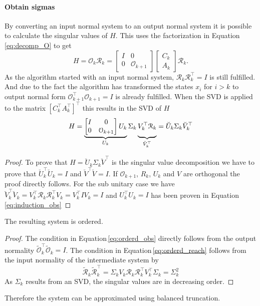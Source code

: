 \documentclass[doctype=mastersthesis,BCOR=15mm,biblatex]{ldvbook}%
\newcommand{\R}{\mathcal{R}} %
\newcommand{\Ob}{\mathcal{O}} %
\newcommand{\eye}{I} %
\begin{document}
\paragraph{Obtain sigmas}
By converting an input normal system to an output normal system it is possible to calculate the singular values of $H$.
This uses the factorization in Equation\,\ref{eq:decomp_O}
to get
 \begin{equation}
 H = \Ob_k \R_k = 
 \begin{bmatrix}
 \eye& 0 \\
 0& \Ob_{k+1}
 \end{bmatrix}
 \begin{bmatrix}
 C_k\\
 A_k
 \end{bmatrix}
 \R_k
 .
 \end{equation}
As the algorithm started with an input normal system, $\R_k\R_k^\top = \eye$ is still fulfilled.
And due to the fact the algorithm has transformed the states $x_i$ for $i>k$ to output normal form $\Ob_{k+1}^\top \Ob_{k+1} = \eye$ is already fulfilled.
When the SVD is applied to the matrix $[C_k^\top A_k^\top]^\top$ this results in the SVD of $H$
 \begin{equation}
 H = 
 \underbrace{
 	\begin{bmatrix}
 	\eye& 0 \\
 	0& \Ob_{k+1}
 	\end{bmatrix}
 	U_k}_{U_k} 
 \Sigma_k 
 \underbrace{\vphantom{\begin{matrix} 0 \\0\end{matrix}}
 	V_k^\top
 	\R_k}_{\breve{V}_k^\top}
 =\breve{U}_k\Sigma_k \breve{V}_k^\top
 \end{equation}

 \begin{proof}
 	To prove that $H = \breve{U}_k\Sigma_k\breve{V}^\top$ is the singular value decomposition we have to prove that $\breve{U}_k^\top \breve{U}_k= \eye$ and $\breve{V}^\top \breve{V} = \eye$.
 	If $\Ob_{k+1}$, $R_k$, $U_k$ and $V$ are orthogonal the proof directly follows. For the sub unitary case we have 
 	$
 	\breve{V}_k^\top \breve{V}_k
 	=
 	V_k^\top
 	\R_k
 	\R_k^\top
 	V_k
 	=
 	V_k^\top
 	\eye
 	V_k
 	=
 	\eye
 	$
 	and
 	$
 	U_k^\top U_k
 	=
 	\eye 
 	$
 	has been proven in Equation\,\ref{eq:induction_obs}
 \end{proof}

The resulting system is ordered.
\begin{proof}
	The condition in Equation\,\ref{eq:orderd_obs} directly follows from the output normality $\tilde{\Ob}_k^\top \tilde{\Ob}_k = \eye$.
	The condition in Equation\,\ref{eq:orderd_reach} follows from the input normality of the intermediate system by
	\begin{equation}
		\tilde{\R}_k \tilde{\R}_k^\top 
		=
		\Sigma_k V_k \R_k \R_k^\top V_k^\top \Sigma_k 
		= \Sigma_k^2
	\end{equation}
	As $\Sigma_k$ results from an SVD, the singular values are in decreasing order. 
\end{proof}
Therefore the system can be approximated using balanced truncation.
\end{document}

